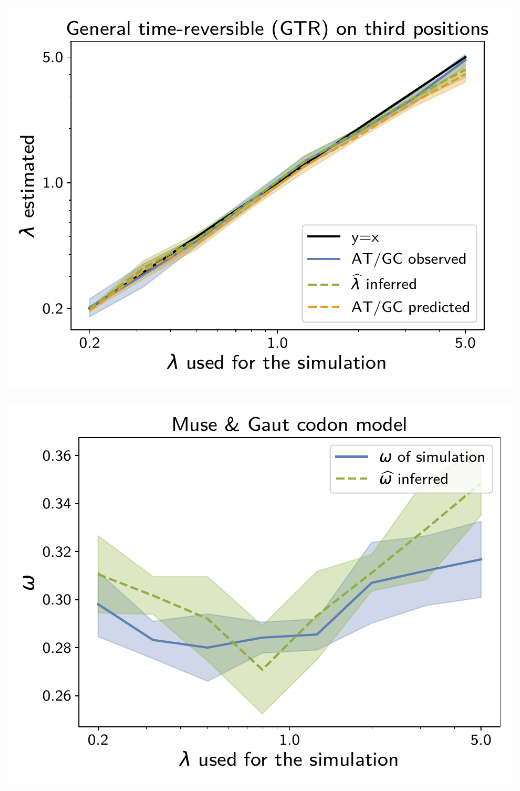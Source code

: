 \documentclass{article}
\begin{document}
\begin{center}
\begin{minipage}{0.325\linewidth}
    \end{minipage}
    \hfill
    \begin{minipage}{0.325\linewidth}
        \includegraphics[width=\linewidth, page=1]{inference_supp_mat/PrimatesExons1Mu1.0_lambda_GTR.pdf}
    \end{minipage}
    \hfill
    \begin{minipage}{0.325\linewidth}
        \includegraphics[width=\linewidth, page=1]{inference_supp_mat/PrimatesExons1Mu1.0_omega_MG.pdf}
    \end{minipage}

\end{center}
\end{document}
